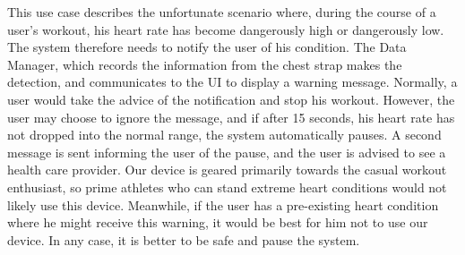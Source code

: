 \documentclass[letterpaper,english, 12pt]{scrreprt}
\begin{document}
This use case describes the unfortunate scenario where, during the course of a user's workout, his heart rate has become dangerously high or dangerously low. The system therefore needs to notify the user of his condition. The Data Manager, which records the information from the chest strap makes the detection, and communicates to the UI to display a warning message. Normally, a user would take the advice of the notification and stop his workout. However, the user may choose to ignore the message, and if after 15 seconds, his heart rate has not dropped into the normal range, the system automatically pauses. A second message is sent informing the user of the pause, and the user is advised to see a health care provider. Our device is geared primarily towards the casual workout enthusiast, so prime athletes who can stand extreme heart conditions would not likely use this device. Meanwhile, if the user has a pre-existing heart condition where he might receive this warning, it would be best for him not to use our device. In any case, it is better to be safe and pause the system.
\end{document}
